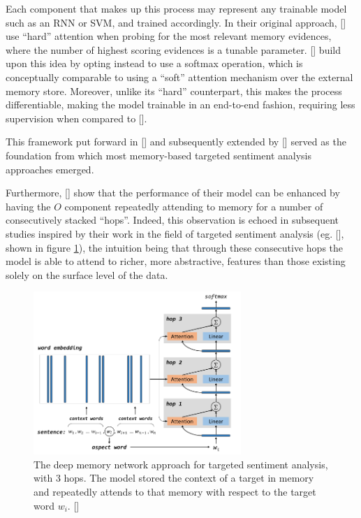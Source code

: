 \documentclass[12pt, a4paper]{report}
\theoremstyle{definition}
\theoremstyle{definition}%
\theoremstyle{definition}%
\theoremstyle{definition}%
\theoremstyle{definition}%
\theoremstyle{definition}%
\renewcommand{\cite}[1]{[\citealp{#1}]}
\begin{document}
Each component that makes up this process may represent any trainable model such as an RNN or SVM, and trained accordingly. In their original approach, \cite{jasonweston2014} use \enquote{hard} attention when probing for the most relevant memory evidences, where the number of highest scoring evidences is a tunable parameter. \cite{sukhbaatar2015} build upon this idea by opting instead to use a softmax operation, which is conceptually comparable to using a \enquote{soft} attention mechanism over the external memory store. Moreover, unlike its \enquote{hard} counterpart, this makes the process differentiable, making the model trainable in an end-to-end fashion, requiring less supervision when compared to \cite{jasonweston2014}.

This framework put forward in \cite{jasonweston2014} and subsequently extended by \cite{sukhbaatar2015} served as the foundation from which most memory-based targeted sentiment analysis approaches emerged.


Furthermore, \cite{sukhbaatar2015} show that the performance of their model can be enhanced by having the $O$ component repeatedly attending to memory for a number of consecutively stacked \enquote{hops}. Indeed, this observation is echoed in subsequent studies inspired by their work in the field of targeted sentiment analysis (eg. \cite{tang2016}, shown in figure \ref{fig:tang_memory_network}), the intuition being that through these consecutive hops the model is able to attend to richer, more abstractive, features than those existing solely on the surface level of the data.

\begin{figure}[!ht]
	\centering
	\includegraphics[width=0.7\textwidth]{./figures/tang_memory_network.png}
	\caption{The deep memory network approach for targeted sentiment analysis, with 3 hops. The model stored the context of a target in memory and repeatedly attends to that memory with respect to the target word $w_i$. \cite{tang2016}}
	\label{fig:tang_memory_network}
\end{figure}
\end{document}
